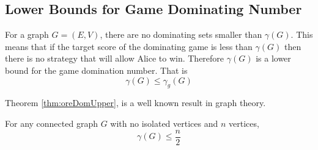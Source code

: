 \subsection{Lower Bounds for Game Dominating Number}
    
For a graph $G=(E,V)$, there are no dominating sets smaller than $\gamma(G)$. This means that if the target score of the dominating game is less than $\gamma(G)$ then there is no strategy that will allow Alice to win. Therefore $\gamma(G)$ is a lower bound for the game domination number. That is \[\gamma(G)\leq\gamma_g(G)\]


Theorem \ref{thm:oreDomUpper}, is a well known result in graph theory.   
\begin{theorem} \label{thm:oreDomUpper} 
    For any connected graph $G$ with no isolated vertices and $n$ vertices,     
    \[\gamma(G) \leq \frac{n}{2}\]
\end{theorem}

